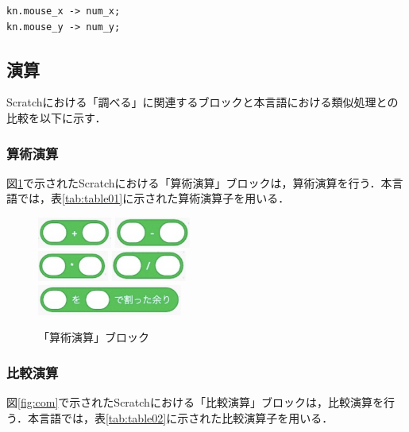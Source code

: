 \documentclass[10pt,a4j]{ltjsarticle}
\begin{document}
\begin{lstlisting}[caption=mouse\_xメソッドとmouse\_yメソッドのプログラム例, label=code34]
kn.mouse_x -> num_x;
kn.mouse_y -> num_y;
\end{lstlisting}

\subsection{演算}
Scratchにおける「調べる」に関連するブロックと本言語における類似処理との比較を以下に示す．
\subsubsection{算術演算}
図\ref{fig:math}で示されたScratchにおける「算術演算」ブロックは，算術演算を行う．本言語では，表\ref{tab:table01}に示された算術演算子を用いる．

\begin{figure}[H]
  \centering
  \includegraphics[height=10mm]{images/add.pdf}
  \includegraphics[height=10mm]{images/sub.pdf} \\
  \includegraphics[height=10mm]{images/mul.pdf}
  \includegraphics[height=10mm]{images/div.pdf} \\
  \includegraphics[height=10mm]{images/rem.pdf}
  \caption{「算術演算」ブロック}
  \label{fig:math}
\end{figure}

\subsubsection{比較演算}
図\ref{fig:com}で示されたScratchにおける「比較演算」ブロックは，比較演算を行う．本言語では，表\ref{tab:table02}に示された比較演算子を用いる．
\end{document}
